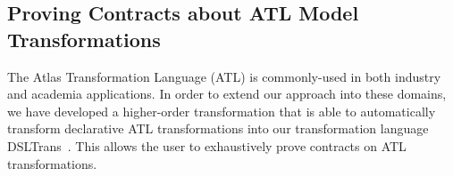 \subsection{Proving Contracts about ATL Model Transformations}
The Atlas Transformation Language (ATL) is commonly-used in both industry and
academia applications. In order to extend our approach into these domains, we
have developed a higher-order transformation that is able to automatically
transform declarative ATL transformations into our transformation language
DSLTrans~\cite{Oakes}. This allows the user to exhaustively prove contracts on
ATL transformations.


 